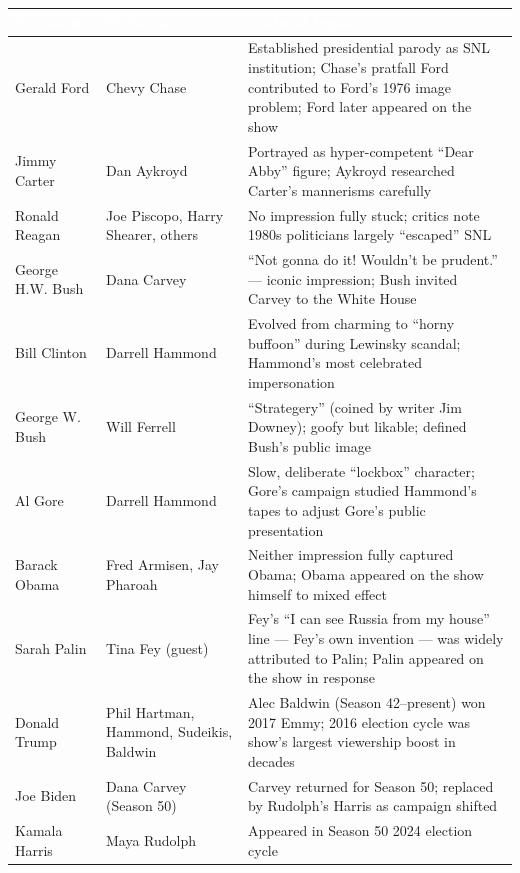 \documentclass[11pt,letterpaper]{article}
\newcommand{\tableheader}[1]{\textbf{\sffamily\textcolor{white}{#1}}}
\begin{document}
\begin{center}
\begin{tabularx}{\textwidth}{L{2.5cm}L{3.2cm}X}
\toprule
{}
\tableheader{President} & \tableheader{Performer(s)} & \tableheader{Cultural Impact} \\
\midrule
Gerald Ford & Chevy Chase & Established presidential parody as SNL institution; Chase's pratfall Ford contributed to Ford's 1976 image problem; Ford later appeared on the show \\
Jimmy Carter & Dan Aykroyd & Portrayed as hyper-competent ``Dear Abby'' figure; Aykroyd researched Carter's mannerisms carefully \\
Ronald Reagan & Joe Piscopo, Harry Shearer, others & No impression fully stuck; critics note 1980s politicians largely ``escaped'' SNL \\
George H.W. Bush & Dana Carvey & ``Not gonna do it! Wouldn't be prudent.'' --- iconic impression; Bush invited Carvey to the White House \\
Bill Clinton & Darrell Hammond & Evolved from charming to ``horny buffoon'' during Lewinsky scandal; Hammond's most celebrated impersonation \\
George W. Bush & Will Ferrell & ``Strategery'' (coined by writer Jim Downey); goofy but likable; defined Bush's public image \\
Al Gore & Darrell Hammond & Slow, deliberate ``lockbox'' character; Gore's campaign studied Hammond's tapes to adjust Gore's public presentation \\
Barack Obama & Fred Armisen, Jay Pharoah & Neither impression fully captured Obama; Obama appeared on the show himself to mixed effect \\
Sarah Palin & Tina Fey (guest) & Fey's ``I can see Russia from my house'' line --- Fey's own invention --- was widely attributed to Palin; Palin appeared on the show in response \\
Donald Trump & Phil Hartman, Hammond, Sudeikis, Baldwin & Alec Baldwin (Season 42--present) won 2017 Emmy; 2016 election cycle was show's largest viewership boost in decades \\
Joe Biden & Dana Carvey (Season 50) & Carvey returned for Season 50; replaced by Rudolph's Harris as campaign shifted \\
Kamala Harris & Maya Rudolph & Appeared in Season 50 2024 election cycle \\
\bottomrule
\end{tabularx}
\end{center}
\end{document}
